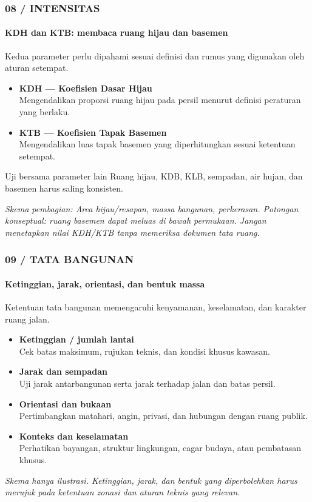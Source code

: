 \documentclass[../main.tex]{subfiles}
\begin{document}
\begin{frame}[mytitle=standard,t]
	\frametitle{08 / INTENSITAS}
	\framesubtitle{KDH dan KTB: membaca ruang hijau dan basemen}

	Kedua parameter perlu dipahami sesuai definisi dan rumus yang digunakan oleh aturan setempat.

	\begin{itemize}
		\item \textbf{KDH — Koefisien Dasar Hijau}\\ Mengendalikan proporsi ruang hijau pada persil menurut definisi peraturan yang berlaku.
		\item \textbf{KTB — Koefisien Tapak Basemen}\\ Mengendalikan luas tapak basemen yang diperhitungkan sesuai ketentuan setempat.
	\end{itemize}

	\begin{block}{Uji bersama parameter lain}
		Ruang hijau, KDB, KLB, sempadan, air hujan, dan basemen harus saling konsisten.
	\end{block}

	\vfill
	\footnotesize\textit{Skema pembagian: Area hijau/resapan, massa bangunan, perkerasan. Potongan konseptual: ruang basemen dapat meluas di bawah permukaan. Jangan menetapkan nilai KDH/KTB tanpa memeriksa dokumen tata ruang.}
\end{frame}

\begin{frame}[mytitle=standard,t,mycolor=digiPH_gray!10]
	\frametitle{09 / TATA BANGUNAN}
	\framesubtitle{Ketinggian, jarak, orientasi, dan bentuk massa}

	Ketentuan tata bangunan memengaruhi kenyamanan, keselamatan, dan karakter ruang jalan.

	\begin{itemize}
		\item \textbf{Ketinggian / jumlah lantai}\\ Cek batas maksimum, rujukan teknis, dan kondisi khusus kawasan.
		\item \textbf{Jarak dan sempadan}\\ Uji jarak antarbangunan serta jarak terhadap jalan dan batas persil.
		\item \textbf{Orientasi dan bukaan}\\ Pertimbangkan matahari, angin, privasi, dan hubungan dengan ruang publik.
		\item \textbf{Konteks dan keselamatan}\\ Perhatikan bayangan, struktur lingkungan, cagar budaya, atau pembatasan khusus.
	\end{itemize}

	\vfill
	\footnotesize\textit{Skema hanya ilustrasi. Ketinggian, jarak, dan bentuk yang diperbolehkan harus merujuk pada ketentuan zonasi dan aturan teknis yang relevan.}
\end{frame}
\end{document}
